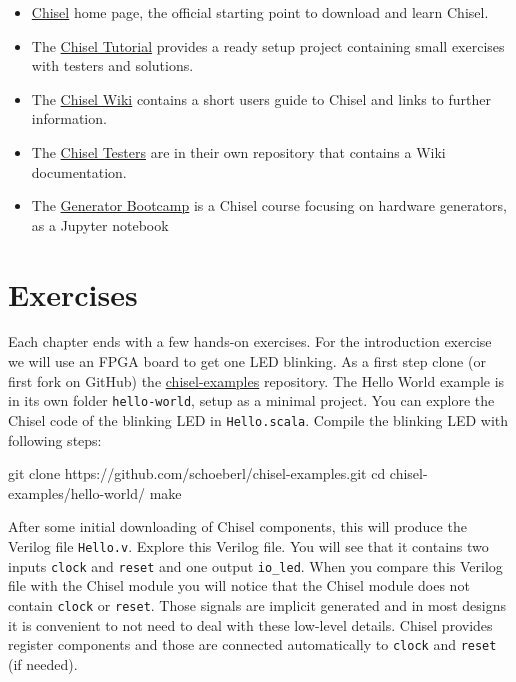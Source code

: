 \documentclass[%
    11pt, %
    headinclude, footexclude,
    openright, %
    notitlepage,
    cleardoubleempty,
    headsepline,
    pointlessnumbers,
    bibtotoc, idxtotoc,
    ]{scrbook}
\newcommand{\code}[1]{{\small{\texttt{#1}}}}
\begin{document}
\begin{itemize}
\item \href{https://chisel.eecs.berkeley.edu/}{Chisel} home page, the official starting point to
download and learn Chisel.
\item The \href{https://github.com/ucb-bar/chisel-tutorial}{Chisel Tutorial} provides a ready setup
project containing small exercises with testers and solutions.

\item The \href{https://github.com/freechipsproject/chisel3/wiki}{Chisel Wiki} contains
a short users guide to Chisel and links to further information.
\item The \href{https://github.com/freechipsproject/chisel-testers}{Chisel Testers} are in
their own repository that contains a Wiki documentation.
\item The \href{https://github.com/ucb-bar/generator-bootcamp}{Generator Bootcamp} is
a Chisel course focusing on hardware generators, as a Jupyter notebook
\end{itemize}

\section{Exercises}

Each chapter ends with a few hands-on exercises. For the introduction exercise we will use an
FPGA board to get one LED blinking.
As a first step clone (or first fork on GitHub) the \href{https://github.com/schoeberl/chisel-examples}{chisel-examples}
repository.
The Hello World example is in its own folder \code{hello-world}, setup as
a minimal project. You can explore the Chisel code of the blinking LED
in \code{Hello.scala}.
Compile the blinking LED with following steps:

\begin{chisel}
git clone https://github.com/schoeberl/chisel-examples.git
cd chisel-examples/hello-world/
make
\end{chisel}

After some initial downloading of Chisel components, this will produce the Verilog file \code{Hello.v}.
Explore this Verilog file. You will see that it contains two inputs \code{clock} and \code{reset}
and one output \code{io\_led}. When you compare this Verilog file with the Chisel module
you will notice that the Chisel module does not contain \code{clock} or \code{reset}.
Those signals are implicit generated and in most designs it is convenient to not need to
deal with these low-level details. Chisel provides register components and those
are connected automatically to \code{clock} and \code{reset} (if needed).
\end{document}

